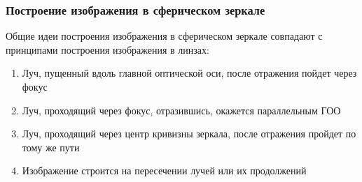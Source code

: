 \subsubsection{Построение изображения в сферическом зеркале}
Общие идеи построения изображения в сферическом зеркале совпадают с принципами построения изображения в линзах: 

\begin{enumerate}
    \item Луч, пущенный вдоль главной оптической оси, после отражения пойдет через фокус
    \item Луч, проходящий через фокус, отразившись, окажется параллельным ГОО
    \item Луч, проходящий через центр кривизны зеркала, после отражения пройдет по тому же пути
    \item Изображение строится на пересечении лучей или их продолжений
\end{enumerate}
